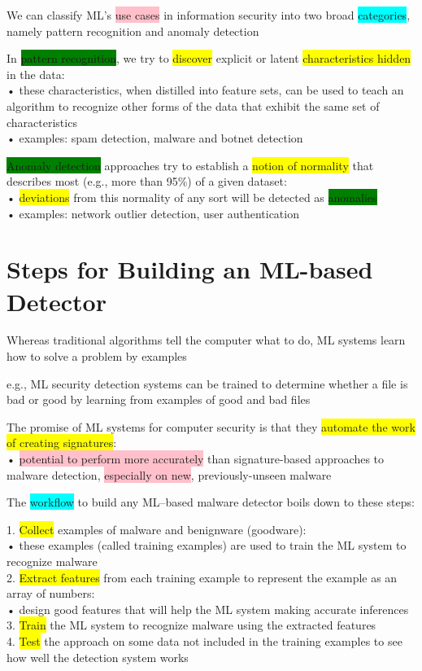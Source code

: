 \documentclass[]{project_plan}
\begin{document}
We can classify ML’s \colorbox{pink}{use cases} in information security into two broad \colorbox{cyan}{categories}, namely pattern recognition and anomaly detection

In \colorbox{green}{pattern recognition}, we try to \colorbox{yellow}{discover} explicit or latent \colorbox{yellow}{characteristics hidden} in the data:\\
• these characteristics, when distilled into feature sets, can be used to teach an algorithm to recognize other forms of the data that exhibit the same set of characteristics\\
• examples: spam detection, malware and botnet detection

\colorbox{green}{Anomaly detection} approaches try to establish a \colorbox{yellow}{notion of normality} that describes most (e.g., more than 95\%) of a given dataset:\\
• \colorbox{yellow}{deviations} from this normality of any sort will be detected as \colorbox{green}{anomalies}\\
• examples: network outlier detection, user authentication

\section{Steps for Building an ML-based Detector}

Whereas traditional algorithms tell the computer what to do, ML systems learn how to solve a problem by examples

e.g., ML security detection systems can be trained to determine whether a file is bad or good by learning from examples of good and bad files

The promise of ML systems for computer security is that they \colorbox{yellow}{automate the work of creating signatures}:\\
• \colorbox{pink}{potential to perform more accurately} than signature-based approaches to malware detection, \colorbox{pink}{especially on new}, previously-unseen malware

The \colorbox{cyan}{workflow} to build any ML–based malware detector boils down to these steps:

1. \colorbox{yellow}{Collect} examples of malware and benignware (goodware):\\
• these examples (called training examples) are used to train the ML system to recognize malware\\
2. \colorbox{yellow}{Extract features} from each training example to represent the example as an array of numbers:\\
• design good features that will help the ML system making accurate inferences\\
3. \colorbox{yellow}{Train} the ML system to recognize malware using the extracted features\\
4. \colorbox{yellow}{Test} the approach on some data not included in the training examples to see how well the detection system works
\end{document}
